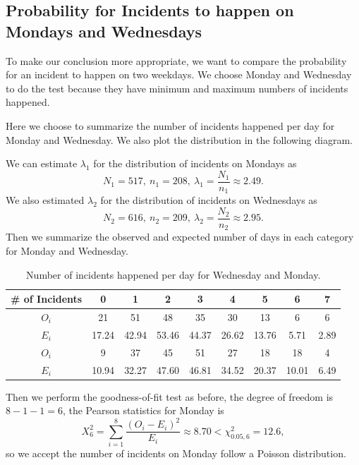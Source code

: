 \documentclass[11pt,a4paper,english]{article}
\begin{document}
\subsection{Probability for Incidents to happen on Mondays and Wednesdays}
To make our conclusion more appropriate, we want to compare the probability for an incident to happen on two weekdays. 
We choose Monday and Wednesday to do the test because they have minimum and maximum numbers of incidents happened.

Here we choose to summarize the number of incidents happened per day for Monday and Wednesday. We also plot the distribution in the following diagram.

We can estimate $\lambda_{1}$ for the distribution of incidents on Mondays as 
\begin{equation*}
	N_{1} = 517,\ n_{1} = 208,\ \hat{\lambda_{1}} = \frac{N_{1}}{n_{1}} \approx 2.49.
\end{equation*}
We also estimated $\lambda_{2}$ for the distribution of incidents on Wednesdays as
\begin{equation*}
	N_{2} = 616,\ n_{2} = 209,\ \hat{\lambda_{2}} = \frac{N_{2}}{n_{2}} \approx 2.95.
\end{equation*}
Then we summarize the observed and expected number of days in each category for Monday and Wednesday.
\begin{table}[htbp]
	\centering
	\caption{Number of incidents happened per day for Wednesday and Monday.}
	\begin{tabular}{c|cccccccc}
		\hline
		\# of Incidents & 0 & 1 & 2 & 3 & 4 & 5 & 6 & 7 \\
		\hline
		$O_{i}$ & 21 & 51 & 48 & 35 & 30 & 13 & 6 & 6\\
		\hline
		$E_{i}$ & 17.24 & 42.94 & 53.46 & 44.37 & 26.62 & 13.76 & 5.71 & 2.89\\
		\hline
		$O_{i}$ & 9 & 37 & 45 & 51 & 27 & 18 & 18 & 4\\
		\hline
		$E_{i}$ & 10.94 & 32.27 & 47.60 & 46.81 & 34.52 & 20.37 & 10.01 & 6.49\\
		\hline
	\end{tabular}
\end{table}
Then we perform the goodness-of-fit test as before, the degree of freedom is $8-1-1 = 6$, the Pearson statistics for Monday is 
\begin{equation*}
	X^{2}_{6} = \sum_{i = 1}^{8}\frac{(O_{i}-E_{i})^{2}}{E_{i}} \approx 8.70 < \chi^{2}_{0.05,6} = 12.6,
\end{equation*}
so we accept the number of incidents on Monday follow a Poisson distribution.
\end{document}
